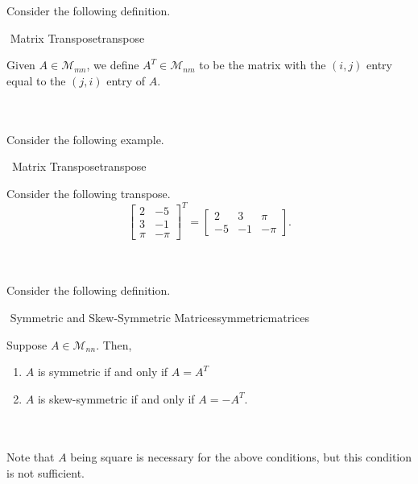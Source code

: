         \pagebreak
        \vphantom
        \\
        \\
        Consider the following definition.
        \begin{definition}{\Stop\,\,Matrix Transpose}{transpose}
        
            Given \(A\in\mathcal{M}_{mn}\), we define \(A^T\in\mathcal{M}_{nm}\) to be the matrix with the \((i,j)\) entry equal to the \((j,i)\) entry of \(A\).
        
        \end{definition}
        \vphantom
        \\
        \\
        Consider the following example.
        \begin{example}{\Difficulty\,\Difficulty\,\,Matrix Transpose}{transpose}
        
            Consider the following transpose.
            \begin{equation*}
                \begin{bmatrix} 2 & -5 \\ 3 & -1 \\ \pi & -\pi \end{bmatrix}^T=\begin{bmatrix} 2 & 3 & \pi \\ -5 & -1 & -\pi \end{bmatrix}.
            \end{equation*}
        
        \end{example}
        \vphantom
        \\
        \\
        Consider the following definition.
        \begin{definition}{\Stop\,\,Symmetric and Skew-Symmetric Matrices}{symmetricmatrices}
        
            Suppose \(A\in\mathcal{M}_{nn}\). Then,
            \begin{enumerate}
                \item \(A\) is symmetric if and only if \(A=A^T\)
                \item \(A\) is skew-symmetric if and only if \(A=-A^T\).
            \end{enumerate}
            \vphantom
            \\
            \\
            Note that \(A\) being square is necessary for the above conditions, but this condition is not sufficient.
        
        \end{definition}
